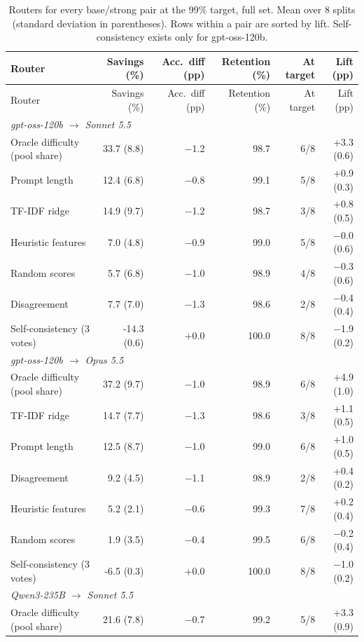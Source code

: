 \begin{longtable}{lrrrrr}
\caption{Routers for every base/strong pair at the 99\% target, full set. Mean over 8 splits (standard deviation in parentheses). Rows within a pair are sorted by lift. Self-consistency exists only for gpt-oss-120b.}\label{tab:pairs_99}\\
\toprule
Router & Savings (\%) & Acc.\ diff (pp) & Retention (\%) & At target & Lift (pp) \\
\midrule
\endfirsthead
\toprule
Router & Savings (\%) & Acc.\ diff (pp) & Retention (\%) & At target & Lift (pp) \\
\midrule
\endhead
\multicolumn{6}{l}{\emph{gpt-oss-120b $\to$ Sonnet 5.5}} \\
Oracle difficulty (pool share) & 33.7 (8.8) & $-$1.2 & 98.7 & 6/8 & +3.3 (0.6) \\
Prompt length & 12.4 (6.8) & $-$0.8 & 99.1 & 5/8 & +0.9 (0.3) \\
TF-IDF ridge & 14.9 (9.7) & $-$1.2 & 98.7 & 3/8 & +0.8 (0.5) \\
Heuristic features & 7.0 (4.8) & $-$0.9 & 99.0 & 5/8 & $-$0.0 (0.6) \\
Random scores & 5.7 (6.8) & $-$1.0 & 98.9 & 4/8 & $-$0.3 (0.6) \\
Disagreement & 7.7 (7.0) & $-$1.3 & 98.6 & 2/8 & $-$0.4 (0.4) \\
Self-consistency (3 votes) & -14.3 (0.6) & +0.0 & 100.0 & 8/8 & $-$1.9 (0.2) \\
\midrule
\multicolumn{6}{l}{\emph{gpt-oss-120b $\to$ Opus 5.5}} \\
Oracle difficulty (pool share) & 37.2 (9.7) & $-$1.0 & 98.9 & 6/8 & +4.9 (1.0) \\
TF-IDF ridge & 14.7 (7.7) & $-$1.3 & 98.6 & 3/8 & +1.1 (0.5) \\
Prompt length & 12.5 (8.7) & $-$1.0 & 99.0 & 6/8 & +1.0 (0.5) \\
Disagreement & 9.2 (4.5) & $-$1.1 & 98.9 & 2/8 & +0.4 (0.2) \\
Heuristic features & 5.2 (2.1) & $-$0.6 & 99.3 & 7/8 & +0.2 (0.4) \\
Random scores & 1.9 (3.5) & $-$0.4 & 99.5 & 6/8 & $-$0.2 (0.4) \\
Self-consistency (3 votes) & -6.5 (0.3) & +0.0 & 100.0 & 8/8 & $-$1.0 (0.2) \\
\midrule
\multicolumn{6}{l}{\emph{Qwen3-235B $\to$ Sonnet 5.5}} \\
Oracle difficulty (pool share) & 21.6 (7.8) & $-$0.7 & 99.2 & 5/8 & +3.3 (0.9) \\

\end{longtable}
